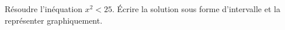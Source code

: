 
\begin{exercice}\label{exosmath-0175}

Résoudre l'inéquation \( x^2<25\). Écrire la solution sous forme d'intervalle et la représenter graphiquement.

\end{exercice}
